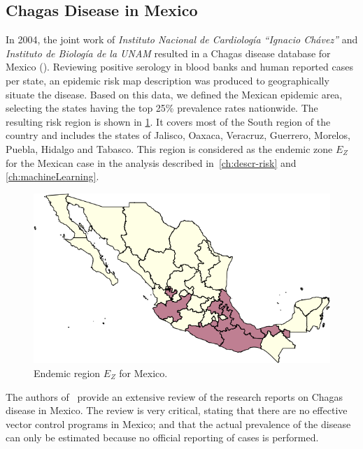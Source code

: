 \subsection{Chagas Disease in  Mexico}\label{endemic_zone_mexico}



In 2004, the joint work of \textit{Instituto Nacional de Cardiología ``Ignacio Chávez''} and  \textit{Instituto de Biología de la UNAM} resulted in a Chagas disease database for Mexico (\cite{cruz2006chagmex}). Reviewing positive serology in blood banks and human reported cases per state, an epidemic risk map description was produced to geographically situate the disease. Based on this data, we defined the Mexican epidemic area, selecting the states having the top 25\% prevalence rates nationwide. The resulting risk region is shown in \cref{fig:endemic_zone_mexico}. It covers most of the South region of the country and includes the states of Jalisco, Oaxaca, Veracruz, Guerrero, Morelos, Puebla, Hidalgo and Tabasco.
This region is considered as the endemic zone $E_Z$ for the Mexican case in the analysis described in~\cref{ch:descr-risk} and \cref{ch:machineLearning}.

\begin{figure}[ht]
\centering
\includegraphics[width=0.75\linewidth]
{figures/Ambientes_Gran_Chaco-Mexico1/Ambientes_Gran_Chaco-Mexico1.png}
\caption{Endemic region $E_Z$ for Mexico.}
\label{fig:endemic_zone_mexico}
\end{figure}


The authors of~\cite{carabarin2013chagas} provide an extensive review of the
research reports on Chagas disease in Mexico.
The review is very critical, stating that there are no effective vector control programs in Mexico;
and that the actual prevalence of the disease
can only be estimated because no official reporting of cases is performed.

